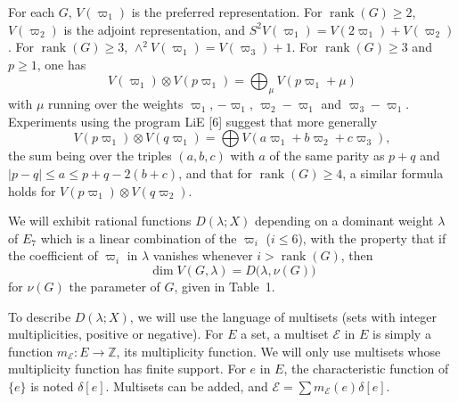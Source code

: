\documentclass[11pt,a4paper]{article}
\DeclareMathOperator{\rank}{rank}
\begin{document}
For each $G$, $V(\varpi_{1})$ is the preferred representation. For $\rank(G) \geqslant 2$, $V(\varpi_{2})$ is the adjoint representation, and $S^{2}V(\varpi_{1}) = V(2\varpi_{1}) + V(\varpi_{2})$. For $\rank(G) \geqslant 3$, $\wedge^{2}V(\varpi_{1}) = V(\varpi_{3}) + 1$. For $\rank(G) \geqslant 3$ and $p \geqslant 1$, one has
\begin{equation*}
V(\varpi_{1}) \otimes V(p\varpi_{1}) = \bigoplus_{\mu} V(p\varpi_{1} + \mu)
\end{equation*}
with $\mu$ running over the weights $\varpi_{1}$, $-\varpi_{1}$, $\varpi_{2} - \varpi_{1}$ and $\varpi_{3} - \varpi_{1}$. Experiments using the program LiE [6] suggest that more generally
\begin{equation*}
V(p\varpi_{1}) \otimes V(q\varpi_{1}) = \bigoplus V(a\varpi_{1} + b\varpi_{2} + c\varpi_{3}),
\end{equation*}
the sum being over the triples $(a,b,c)$ with $a$ of the same parity as $p+q$ and $|p-q| \leqslant a \leqslant p+q-2(b+c)$, and that for $\rank(G) \geqslant 4$, a similar formula holds for $V(p\varpi_{1}) \otimes V(q\varpi_{2})$.

We will exhibit rational functions $D(\lambda; X)$ depending on a dominant weight $\lambda$ of $E_{7}$ which is a linear combination of the $\varpi_{i}$ ($i \leqslant 6$), with the property that if the coefficient of $\varpi_{i}$ in $\lambda$ vanishes whenever $i > \rank(G)$, then
\begin{equation*}
\dim V(G, \lambda) = D\bigl(\lambda, \nu(G)\bigr)
\end{equation*}
for $\nu(G)$ the parameter of $G$, given in Table~1.

To describe $D(\lambda; X)$, we will use the language of multisets (sets with integer multiplicities, positive or negative). For $E$ a set, a multiset $\mathcal{E}$ in $E$ is simply a function $m_{\mathcal{E}}: E \to \mathbb{Z}$, its multiplicity function. We will only use multisets whose multiplicity function has finite support. For $e$ in $E$, the characteristic function of $\{e\}$ is noted $\delta[e]$. Multisets can be added, and $\mathcal{E} = \sum m_{\mathcal{E}}(e)\delta[e]$.
\end{document}
